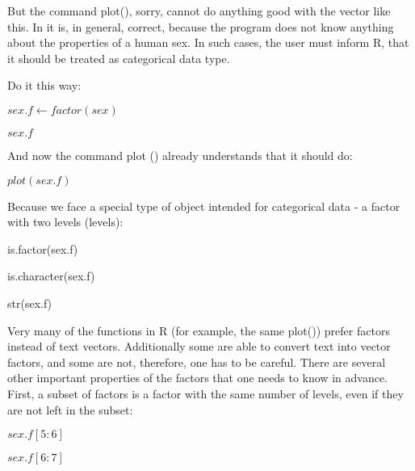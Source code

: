 \documentclass{beamer}
\begin{document}
\begin{frame}{}
But the command plot(), sorry, cannot do anything good with the vector like this. In it is, in general, correct, because the program does not know anything about the properties of a human sex. In such cases, the user must inform R, that it should be treated as categorical data type. 

Do it this way:
\begin{center}

$sex.f \leftarrow factor(sex)$

$sex.f$

\end{center}
\end{frame}

\begin{frame}{}
And now the command plot () already understands that it should do:
\begin{center}

$plot(sex.f)$

\end{center}
\end{frame}

\begin{frame}{}
Because we face a special type of object intended for categorical data - a factor with two levels (levels):

\begin{center}
is.factor(sex.f)

is.character(sex.f)

str(sex.f)


\end{center}
\end{frame}


\begin{frame}{}

Very many of the functions in R (for example, the same plot()) prefer factors instead of text vectors. Additionally some are able to convert text into vector factors, and some are not, therefore, one has to be careful.
There are several other important properties of the factors that one needs to know in advance. First, a subset of factors is a factor with the same number of levels, even if they are not left in the subset:

\begin{center}

$sex.f[5:6]$

$sex.f[6:7]$


\end{center}
\end{frame}
\end{document}
